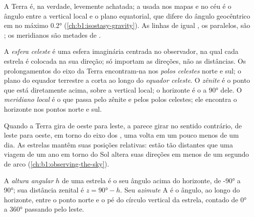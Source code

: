 A Terra é, na verdade, levemente achatada; a  usada nos mapas e no céu é o ângulo entre a vertical local e o plano equatorial, que difere do ângulo geocêntrico em no máximo \ang{0.2} (\cref{ch:b1:isostasy-gravity}). As linhas de igual , os paralelos, são ; os meridianos são metades de .

\begin{definition}\label{def:b1:spherical-astronomy:celestial-sphere}
A \emph{esfera celeste} é uma esfera imaginária centrada no observador, na qual cada estrela é colocada na sua direção; só importam as direções, não as distâncias. Os prolongamentos do eixo da Terra encontram-na nos \emph{polos celestes} norte e sul; o plano do equador terrestre a corta ao longo do \emph{equador celeste}. O \emph{zênite} é o ponto que está diretamente acima, sobre a vertical local; o horizonte é o  a $\ang{90}$ dele. O \emph{meridiano local} é o  que passa pelo zênite e pelos polos celestes; ele encontra o horizonte nos pontos norte e sul.
\end{definition}

Quando a Terra gira de oeste para leste, a  parece girar no sentido contrário, de leste para oeste, em torno do eixo dos , uma volta em um pouco menos de um dia. As estrelas mantêm suas posições relativas: estão tão distantes que uma viagem de um ano em torno do Sol altera suas direções em menos de um segundo de arco (\cref{ch:b1:observing-the-sky}).

\begin{definition}\label{def:b1:spherical-astronomy:horizontal}
A \emph{altura angular} $h$ de uma estrela é o seu ângulo acima do horizonte, de \ang{-90} a \ang{90}; sua distância zenital é $z = \ang{90} - h$. Seu \emph{azimute} $\mathrm{A}$ é o ângulo, ao longo do horizonte, entre o ponto norte e o pé do círculo vertical da estrela, contado de \ang{0} a \ang{360} passando pelo leste.
\end{definition}

